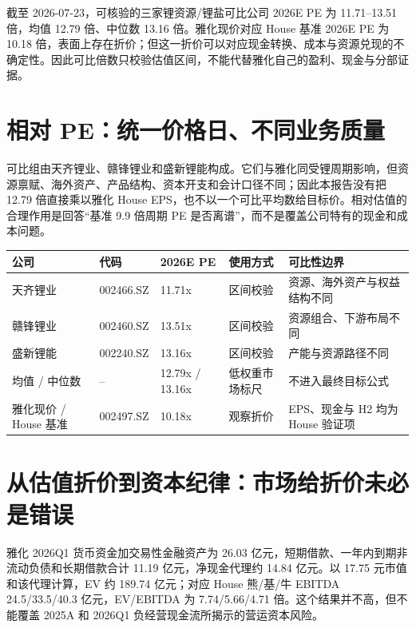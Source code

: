 \begin{houseviewbox}
截至 2026-07-23，可核验的三家锂资源/锂盐可比公司 2026E PE 为 11.71--13.51 倍，均值 12.79 倍、中位数 13.16 倍。雅化现价对应 House 基准 2026E PE 为 10.18 倍，表面上存在折价；但这一折价可以对应现金转换、成本与资源兑现的不确定性。因此可比倍数只校验估值区间，不能代替雅化自己的盈利、现金与分部证据。
\end{houseviewbox}

\section{相对 PE：统一价格日、不同业务质量}

可比组由天齐锂业、赣锋锂业和盛新锂能构成。它们与雅化同受锂周期影响，但资源禀赋、海外资产、产品结构、资本开支和会计口径不同；因此本报告没有把 12.79 倍直接乘以雅化 House EPS，也不以一个可比平均数给目标价。相对估值的合理作用是回答“基准 9.9 倍周期 PE 是否离谱”，而不是覆盖公司特有的现金和成本问题。

\begin{exhibitbox}[表 12-1：锂产业链可比公司 2026E PE]
\begin{tabularx}{\exhibitboxwidth}{L{3.0cm}L{2.0cm}R{2.3cm}R{2.3cm}X}
\toprule
公司 & 代码 & 2026E PE & 使用方式 & 可比性边界 \\
\midrule
天齐锂业 & 002466.SZ & 11.71x & 区间校验 & 资源、海外资产与权益结构不同 \\
赣锋锂业 & 002460.SZ & 13.51x & 区间校验 & 资源组合、下游布局不同 \\
盛新锂能 & 002240.SZ & 13.16x & 区间校验 & 产能与资源路径不同 \\
均值 / 中位数 & -- & 12.79x / 13.16x & 低权重市场标尺 & 不进入最终目标公式 \\
雅化现价 / House 基准 & 002497.SZ & 10.18x & 观察折价 & EPS、现金与 H2 均为 House 验证项 \\
\bottomrule
\end{tabularx}
\end{exhibitbox}

\section{从估值折价到资本纪律：市场给折价未必是错误}

雅化 2026Q1 货币资金加交易性金融资产为 26.03 亿元，短期借款、一年内到期非流动负债和长期借款合计 11.19 亿元，净现金代理约 14.84 亿元。以 17.75 元市值和该代理计算，EV 约 189.74 亿元；对应 House 熊/基/牛 EBITDA 24.5/33.5/40.3 亿元，EV/EBITDA 为 7.74/5.66/4.71 倍。这个结果并不高，但不能覆盖 2025A 和 2026Q1 负经营现金流所揭示的营运资本风险。


